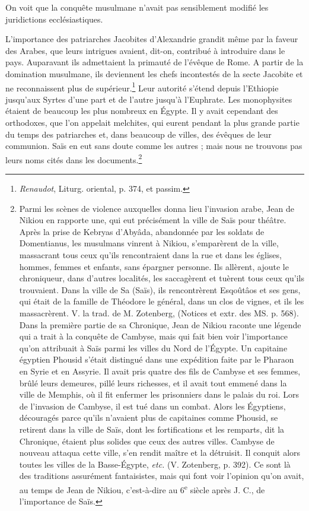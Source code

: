 \documentclass[letterpaper,twocolumn,openany,nodeprecatedcode]{dndbook}
\begin{document}
On voit que la conquête musulmane n'avait pas sensiblement modifié les juridictions ecclésiastiques.

\clearpage

L'importance des patriarches Jacobites d'Alexandrie grandit même par la faveur des Arabes, que leurs intrigues avaient, dit-on, contribué à introduire dans le pays. Auparavant ils admettaient la primauté de l'évêque de Rome. A partir de la domination musulmane, ils deviennent les chefs incontestés de la secte Jacobite et ne reconnaissent plus de supérieur.\footnote{\emph{Renaudot}, Liturg. oriental, p. 374, et passim.} Leur autorité s'étend depuis l'Ethiopie jusqu'aux Syrtes d'une part et de l'autre jusqu'à l'Euphrate. Les monophysites étaient de beaucoup les plus nombreux en Égypte. Il y avait cependant des orthodoxes, que l'on appelait melchites, qui eurent pendant la plus grande partie du temps des patriarches et, dans beaucoup de villes, des évêques de leur communion. Saïs en eut sans doute comme les autres ; mais nous ne trouvons pas leurs noms cités dans les documents.\footnote{Parmi les scènes de violence auxquelles donna lieu l'invasion arabe, Jean de Nikiou en rapporte une, qui eut précisément la ville de Saïs pour théâtre. Après la prise de Kebryas d'Abyâda, abandonnée par les soldats de Domentianus, les musulmans vinrent à Nikiou, s'emparèrent de la ville, massacrant tous ceux qu'ils rencontraient dans la rue et dans les églises, hommes, femmes et enfants, sans épargner personne. Ils allèrent, ajoute le chroniqueur, dans d'autres localités, les saccagèrent et tuèrent tous ceux qu'ils trouvaient. Dans la ville de Sa (Saïs), ils rencontrèrent Esqoûtâos et ses gens, qui était de la famille de Théodore le général, dans un clos de vignes, et ils les massacrèrent. V. la trad. de M. Zotenberg, (Notices et extr. des MS. p. 568).\\\hspace*{5mm}Dans la première partie de sa Chronique, Jean de Nikiou raconte une légende qui a trait à la conquête de Cambyse, mais qui fait bien voir l'importance qu'on attribuait à Saïs parmi les villes du Nord de l'Égypte. Un capitaine égyptien Phousid s'était distingué dans une expédition faite par le Pharaon en Syrie et en Assyrie. Il avait pris quatre des fils de Cambyse et ses femmes, brûlé leurs demeures, pillé leurs richesses, et il avait tout emmené dans la ville de Memphis, où il fit enfermer les prisonniers dans le palais du roi. Lors de l'invasion de Cambyse, il est tué dans un combat. Alors les Égyptiens, découragés parce qu’ils n'avaient plus de capitaines comme Phousid, se retirent dans la ville de Saïs, dont les fortifications et les remparts, dit la Chronique, étaient plus solides que ceux des autres villes. Cambyse de nouveau attaqua cette ville, s'en rendit maître et la détruisit. Il conquit alors toutes les villes de la Basse-Égypte, \emph{etc.} (V. Zotenberg, p. 392). Ce sont là des traditions assurément fantaisistes, mais qui font voir l'opinion qu'on avait, au temps de Jean de Nikiou, c'est-à-dire au 6\textsuperscript{e} siècle après J. C., de l'importance de Saïs.}
\end{document}
